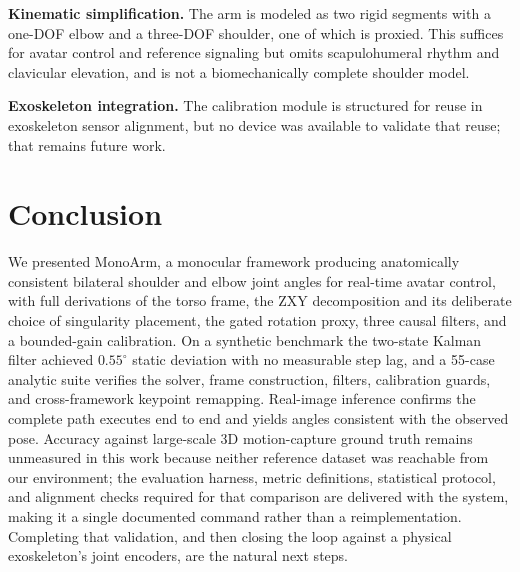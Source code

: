 \documentclass[conference]{IEEEtran}
\begin{document}
\textbf{Kinematic simplification.} The arm is modeled as two rigid
segments with a one-DOF elbow and a three-DOF shoulder, one of which is
proxied. This suffices for avatar control and reference signaling but
omits scapulohumeral rhythm and clavicular elevation, and is not a
biomechanically complete shoulder model.

\textbf{Exoskeleton integration.} The calibration module is structured
for reuse in exoskeleton sensor alignment, but no device was available to
validate that reuse; that remains future work.

\section{Conclusion}
We presented MonoArm, a monocular framework producing anatomically
consistent bilateral shoulder and elbow joint angles for real-time avatar
control, with full derivations of the torso frame, the ZXY decomposition
and its deliberate choice of singularity placement, the gated rotation
proxy, three causal filters, and a bounded-gain calibration. On a
synthetic benchmark the two-state Kalman filter achieved $0.55^\circ$
static deviation with no measurable step lag, and a 55-case analytic
suite verifies the solver, frame construction, filters, calibration
guards, and cross-framework keypoint remapping. Real-image inference
confirms the complete path executes end to end and yields angles
consistent with the observed pose. Accuracy against large-scale 3D
motion-capture ground truth remains unmeasured in this work because
neither reference dataset was reachable from our environment; the
evaluation harness, metric definitions, statistical protocol, and
alignment checks required for that comparison are delivered with the
system, making it a single documented command rather than a
reimplementation. Completing that validation, and then closing the loop
against a physical exoskeleton's joint encoders, are the natural next
steps.
\end{document}
